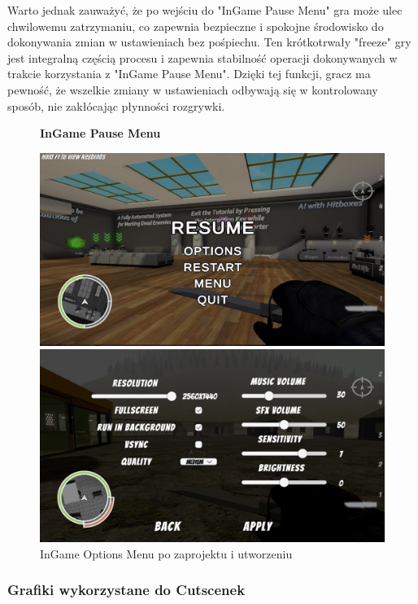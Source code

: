 Warto jednak zauważyć, że po wejściu do "InGame Pause Menu" gra może ulec chwilowemu zatrzymaniu, co zapewnia bezpieczne i spokojne środowisko do dokonywania zmian w ustawieniach bez pośpiechu. Ten krótkotrwały "freeze" gry jest integralną częścią procesu i zapewnia stabilność operacji dokonywanych w trakcie korzystania z "InGame Pause Menu". Dzięki tej funkcji, gracz ma pewność, że wszelkie zmiany w ustawieniach odbywają się w kontrolowany sposób, nie zakłócając płynności rozgrywki.

\begin{figure}[h]
\begin{center}
{\bfseries InGame Pause Menu}
\end{center}
    \centering
    \includegraphics[width=1\linewidth]{Images/menuIngameupdated2.jpg}
        \caption{InGame Pause Menu po zaprojektu i utworzeniu}
    \includegraphics[width=1\linewidth]{Images/menuIngameUpdated.jpg}
    \caption{InGame Options Menu po zaprojektu i utworzeniu}
\end{figure}
\FloatBarrier

\subsubsection{Grafiki wykorzystane do Cutscenek}

